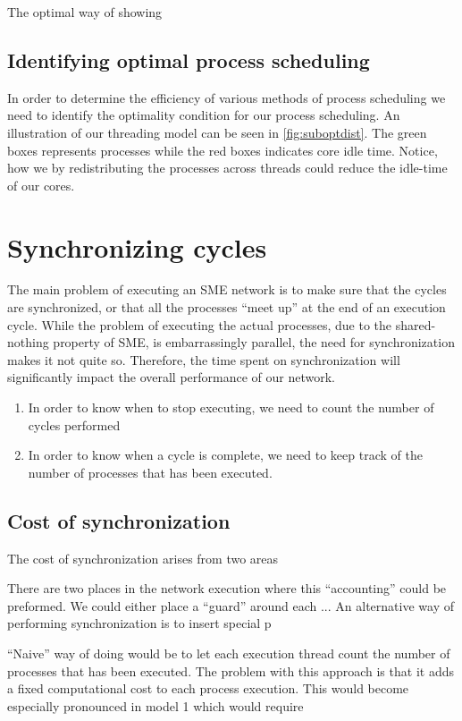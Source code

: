 The optimal way of showing 

\subsection{Identifying optimal process scheduling}
In order to determine the efficiency of various methods of process
scheduling we need to identify the optimality condition for our
process scheduling. An illustration of our threading model can be seen in
\cref{fig:suboptdist}. The green boxes represents processes while the
red boxes indicates core idle time. Notice, how we by redistributing
the processes across threads could reduce the idle-time of our
cores.


\section{Synchronizing cycles}
The main problem of executing an SME network is to make sure that the
cycles are synchronized, or that all the processes ``meet up'' at the
end of an execution cycle. While the problem of executing the actual
processes, due to the shared-nothing property of SME, is embarrassingly
parallel, the need for synchronization makes it not quite
so. Therefore, the time spent on synchronization will significantly
impact the overall performance of our network.

\begin{enumerate}
\item In order to know when to stop executing, we need to count the
  number of cycles performed
\item In order to know when a cycle is complete, we need to keep track
  of the number of processes that has been executed.
\end{enumerate}

\subsection{Cost of synchronization}
The cost of synchronization arises from two areas


There are two places in the network execution where this
``accounting'' could be preformed. We could either place a ``guard''
around each ... An alternative way of performing synchronization is to
insert special p

``Naive'' way of doing would be to let each execution thread count the
number of processes that has been executed. The problem with this
approach is that it adds a fixed computational cost to each process
execution. This would become especially pronounced in model 1
which would require 

